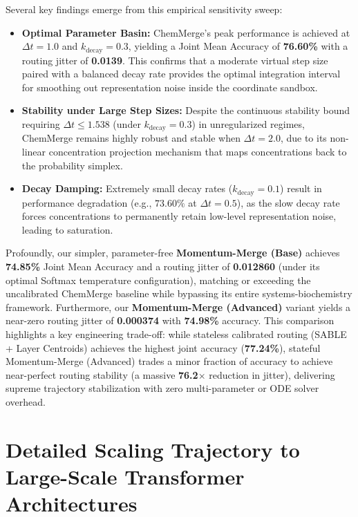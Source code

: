 \documentclass{article}
\theoremstyle{plain}
\theoremstyle{definition}
\theoremstyle{remark}
\begin{document}
Several key findings emerge from this empirical sensitivity sweep:
\begin{itemize}
    \item \textbf{Optimal Parameter Basin:} ChemMerge's peak performance is achieved at $\Delta t = 1.0$ and $k_{\text{decay}} = 0.3$, yielding a Joint Mean Accuracy of \textbf{76.60\%} with a routing jitter of \textbf{0.0139}. This confirms that a moderate virtual step size paired with a balanced decay rate provides the optimal integration interval for smoothing out representation noise inside the coordinate sandbox.
    \item \textbf{Stability under Large Step Sizes:} Despite the continuous stability bound requiring $\Delta t \le 1.538$ (under $k_{\text{decay}} = 0.3$) in unregularized regimes, ChemMerge remains highly robust and stable when $\Delta t = 2.0$, due to its non-linear concentration projection mechanism that maps concentrations back to the probability simplex.
    \item \textbf{Decay Damping:} Extremely small decay rates ($k_{\text{decay}} = 0.1$) result in performance degradation (e.g., $73.60\%$ at $\Delta t = 0.5$), as the slow decay rate forces concentrations to permanently retain low-level representation noise, leading to saturation.
\end{itemize}
Profoundly, our simpler, parameter-free \textbf{Momentum-Merge (Base)} achieves \textbf{74.85\%} Joint Mean Accuracy and a routing jitter of \textbf{0.012860} (under its optimal Softmax temperature configuration), matching or exceeding the uncalibrated ChemMerge baseline while bypassing its entire systems-biochemistry framework. Furthermore, our \textbf{Momentum-Merge (Advanced)} variant yields a near-zero routing jitter of \textbf{0.000374} with \textbf{74.98\%} accuracy. This comparison highlights a key engineering trade-off: while stateless calibrated routing (SABLE + Layer Centroids) achieves the highest joint accuracy (\textbf{77.24\%}), stateful Momentum-Merge (Advanced) trades a minor fraction of accuracy to achieve near-perfect routing stability (a massive \textbf{76.2$\times$} reduction in jitter), delivering supreme trajectory stabilization with zero multi-parameter or ODE solver overhead.

\section{Detailed Scaling Trajectory to Large-Scale Transformer Architectures}
\label{app:scaling_trajectory}
\end{document}
